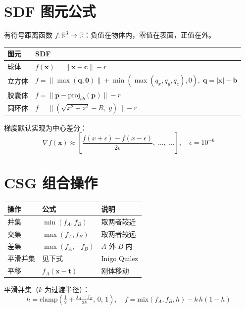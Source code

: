 \documentclass[11pt,a4paper]{article}
\begin{document}
\section{SDF 图元公式}

有符号距离函数 $f:\mathbb{R}^3\to\mathbb{R}$：负值在物体内，零值在表面，正值在外。

\begin{center}
\renewcommand{\arraystretch}{1.6}
\begin{tabular}{@{}ll@{}}
  \toprule
  \textbf{图元} & \textbf{SDF} \\
  \midrule
  球体 & $f(\mathbf{x})=\|\mathbf{x}-\mathbf{c}\|-r$ \\
  立方体 & $f=\|\max(\mathbf{q},\mathbf{0})\|+\min(\max(q_x,q_y,q_z),0),\;\mathbf{q}=|\mathbf{x}|-\mathbf{b}$ \\
  胶囊体 & $f=\|\mathbf{p}-\text{proj}_{\overline{ab}}(\mathbf{p})\|-r$ \\
  圆环体 & $f=\|(\sqrt{x^2+z^2}-R,\;y)\|-r$ \\
  \bottomrule
\end{tabular}
\end{center}

梯度默认实现为中心差分：
\[
  \nabla f(\mathbf{x}) \approx
  \left[\frac{f(x+\epsilon)-f(x-\epsilon)}{2\epsilon},\;\ldots,\;\ldots\right],
  \quad \epsilon=10^{-6}
\]

\section{CSG 组合操作}

\begin{center}
\renewcommand{\arraystretch}{1.4}
\begin{tabular}{@{}lll@{}}
  \toprule
  \textbf{操作} & \textbf{公式} & \textbf{说明} \\
  \midrule
  并集 & $\min(f_A, f_B)$ & 取两者较近 \\
  交集 & $\max(f_A, f_B)$ & 取两者较远 \\
  差集 & $\max(f_A, -f_B)$ & $A$ 外 $B$ 内 \\
  平滑并集 & 见下式 & Inigo Quilez \\
  平移 & $f_A(\mathbf{x}-\mathbf{t})$ & 刚体移动 \\
  \bottomrule
\end{tabular}
\end{center}

平滑并集（$k$ 为过渡半径）：
\[
  h=\text{clamp}\!\left(\tfrac{1}{2}+\tfrac{f_A-f_B}{2k},\,0,\,1\right),\quad
  f=\text{mix}(f_A,f_B,h)-k\,h(1-h)
\]
\end{document}
